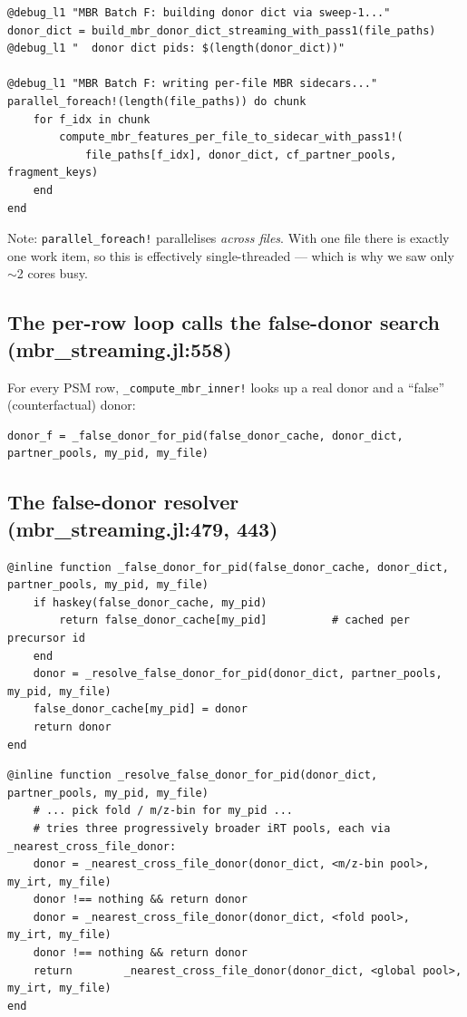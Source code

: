 \documentclass[11pt]{article}
\begin{document}
\begin{lstlisting}[firstnumber=304]
@debug_l1 "MBR Batch F: building donor dict via sweep-1..."
donor_dict = build_mbr_donor_dict_streaming_with_pass1(file_paths)
@debug_l1 "  donor dict pids: $(length(donor_dict))"

@debug_l1 "MBR Batch F: writing per-file MBR sidecars..."
parallel_foreach!(length(file_paths)) do chunk
    for f_idx in chunk
        compute_mbr_features_per_file_to_sidecar_with_pass1!(
            file_paths[f_idx], donor_dict, cf_partner_pools, fragment_keys)
    end
end
\end{lstlisting}

\noindent Note: \texttt{parallel\_foreach!} parallelises \emph{across files}. With one
file there is exactly one work item, so this is effectively single-threaded --- which
is why we saw only $\sim$2 cores busy.

\subsection{The per-row loop calls the false-donor search (mbr\_streaming.jl:558)}

For every PSM row, \texttt{\_compute\_mbr\_inner!} looks up a real donor and a
``false'' (counterfactual) donor:

\begin{lstlisting}[firstnumber=558]
donor_f = _false_donor_for_pid(false_donor_cache, donor_dict, partner_pools, my_pid, my_file)
\end{lstlisting}

\subsection{The false-donor resolver (mbr\_streaming.jl:479, 443)}

\begin{lstlisting}[firstnumber=479]
@inline function _false_donor_for_pid(false_donor_cache, donor_dict, partner_pools, my_pid, my_file)
    if haskey(false_donor_cache, my_pid)
        return false_donor_cache[my_pid]          # cached per precursor id
    end
    donor = _resolve_false_donor_for_pid(donor_dict, partner_pools, my_pid, my_file)
    false_donor_cache[my_pid] = donor
    return donor
end
\end{lstlisting}

\begin{lstlisting}[firstnumber=443]
@inline function _resolve_false_donor_for_pid(donor_dict, partner_pools, my_pid, my_file)
    # ... pick fold / m/z-bin for my_pid ...
    # tries three progressively broader iRT pools, each via _nearest_cross_file_donor:
    donor = _nearest_cross_file_donor(donor_dict, <m/z-bin pool>, my_irt, my_file)
    donor !== nothing && return donor
    donor = _nearest_cross_file_donor(donor_dict, <fold pool>,   my_irt, my_file)
    donor !== nothing && return donor
    return        _nearest_cross_file_donor(donor_dict, <global pool>, my_irt, my_file)
end
\end{lstlisting}
\end{document}
